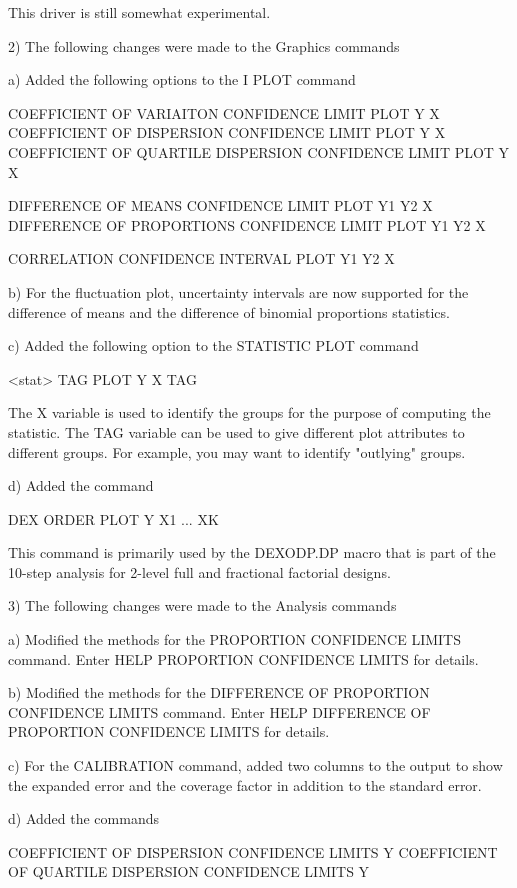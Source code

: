     This driver is still somewhat experimental.

 2) The following changes were made to the Graphics commands

    a) Added the following options to the I PLOT command

         COEFFICIENT OF VARIAITON CONFIDENCE LIMIT PLOT Y X
         COEFFICIENT OF DISPERSION CONFIDENCE LIMIT PLOT Y X
         COEFFICIENT OF QUARTILE DISPERSION CONFIDENCE LIMIT PLOT Y X

         DIFFERENCE OF MEANS CONFIDENCE LIMIT PLOT Y1 Y2 X
         DIFFERENCE OF PROPORTIONS CONFIDENCE LIMIT PLOT Y1 Y2 X

         CORRELATION CONFIDENCE INTERVAL PLOT Y1 Y2 X

    b) For the fluctuation plot, uncertainty intervals are now
       supported for the difference of means and the difference
       of binomial proportions statistics.

    c) Added the following option to the STATISTIC PLOT command

          <stat> TAG PLOT Y X TAG

       The X variable is used to identify the groups for the
       purpose of computing the statistic.  The TAG variable can
       be used to give different plot attributes to different
       groups.  For example, you may want to identify "outlying"
       groups.

    d) Added the command

         DEX ORDER PLOT Y X1 ... XK

       This command is primarily used by the DEXODP.DP macro that is
       part of the 10-step analysis for 2-level full and fractional
       factorial designs.

 3) The following changes were made to the Analysis commands

    a) Modified the methods for the PROPORTION CONFIDENCE LIMITS
       command.  Enter HELP PROPORTION CONFIDENCE LIMITS for details.

    b) Modified the methods for the DIFFERENCE OF PROPORTION CONFIDENCE
       LIMITS command.  Enter HELP DIFFERENCE OF PROPORTION CONFIDENCE
       LIMITS for details.

    c) For the CALIBRATION command, added two columns to the output to
       show the expanded error and the coverage factor in addition to
       the standard error.

    d) Added the commands

           COEFFICIENT OF DISPERSION CONFIDENCE LIMITS Y
           COEFFICIENT OF QUARTILE DISPERSION CONFIDENCE LIMITS Y

